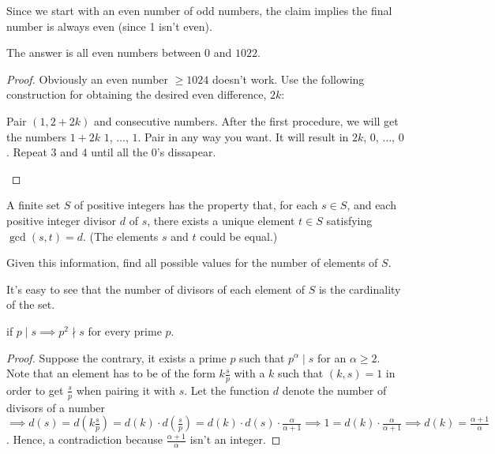 Since we start with an even number of odd numbers, the claim 
implies the final number is always even (since 1 isn't even). 

\begin{claim}
  The answer is all even numbers between $0$ and $1022$.
\end{claim}

\begin{proof}
  Obviously an even number $\ge 1024$ doesn't work. 
  Use the following construction for obtaining the desired 
  even difference, $2k$:

  \begin{enumerate}
    \ii Pair $(1, 2 + 2k)$ and consecutive numbers. 
    \ii After the first procedure, we will get the numbers 
    $1+2k$ $1$, $\dots$, $1$.
    \ii Pair in any way you want.
    \ii It will result in $2k$, $0$, $\dots$, $0$.
    \ii Repeat $3$ and $4$ until all the $0$'s dissapear.
  \end{enumerate}
\end{proof}

\begin{problem}
  A finite set $S$ of positive integers has the property that,
  for each $s\in S$, and each positive integer divisor $d$ of $s$,
  there exists a unique element $t\in S$ satisfying $\gcd(s,t) = d$.
  (The elements $s$ and $t$ could be equal.)

  Given this information, find all possible values for the
  number of elements of $S$.
\end{problem}

It's easy to see that the number of divisors of each element 
of $S$ is the cardinality of the set.

\begin{claim}
  if $p \mid s \implies p^2 \nmid s$ for every prime $p$.  
\end{claim}

\begin{proof}
  Suppose the contrary, it exists a prime $p$ such that 
  $p^{\alpha} \mid s$ for an $\alpha \ge 2$. 
  Note that an element has to be of the form 
  $k\frac{s}{p}$ with a $k$ such that $(k, s) = 1$ in order to
  get $\frac{s}{p}$ when pairing it with $s$. Let the function $d$ 
  denote the number of divisors of a number $\implies 
  d(s) = d(k\frac{s}{p}) = 
  d(k) \cdot d(\frac{s}{p}) = d(k) \cdot d(s) \cdot 
  \frac{\alpha}{\alpha + 1} \implies 1 = d(k) \cdot 
  \frac{\alpha}{\alpha + 1} \implies  d(k) = 
  \frac{\alpha + 1}{\alpha}$. Hence, a contradiction because 
  $\frac{\alpha + 1}{\alpha}$ isn't an integer.
\end{proof}

